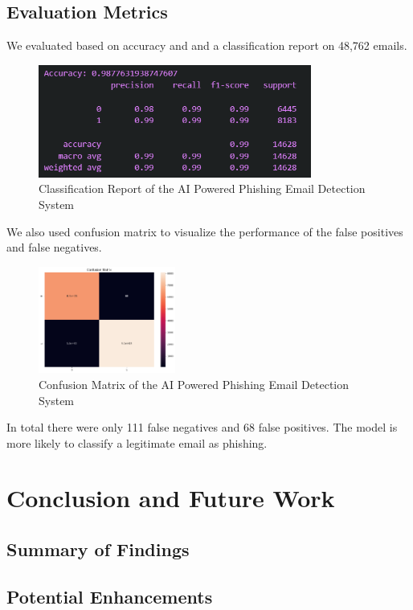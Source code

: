 \documentclass{article}
\begin{document}
\subsection{Evaluation Metrics}
We evaluated based on accuracy and and a classification report on 48,762 emails.
\begin{figure}[h!]
    \centering
    \includegraphics[width=0.8\textwidth]{classification_report.png}
    \caption{Classification Report of the AI Powered Phishing Email Detection System}
    \label{fig:classification-report}
\end{figure}
We also used confusion matrix to visualize the performance of the false positives and false negatives.
\begin{figure}[h!]
    \centering
    \includegraphics[width=0.4\textwidth]{confusion_matrix.png}
    \caption{Confusion Matrix of the AI Powered Phishing Email Detection System}
    \label{fig:confusion-matrix}
\end{figure}
In total there were only 111 false negatives and 68 false positives. The model is more likely to classify a legitimate email as phishing.
\newpage
\section{Conclusion and Future Work}

\subsection{Summary of Findings}

\subsection{Potential Enhancements}

\newpage



\end{document}
